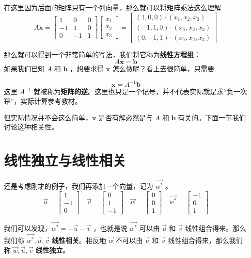 在这里因为后面的矩阵只有一个列向量，那么就可以将矩阵乘法这么理解
$$
A\mathbf x=\begin{bmatrix}1 & 0 & 0\\-1 & 1 & 0\\0 & -1 & 1\end{bmatrix}\begin{bmatrix}x_1\\x_2\\x_3\end{bmatrix}=\begin{bmatrix}(1,0,0)\cdot(x_1,x_2,x_3)\\(-1,1,0)\cdot(x_1,x_2,x_3)\\(0,-1,1)\cdot(x_1,x_2,x_3)\end{bmatrix}
$$

那么就可以得到一个非常简单的写法，我们将它称为\textbf{线性方程组}：
$$
A\mathbf x=\mathbf b
$$
如果我们已知 $A$ 和 $\mathbf b$ ，想要求得 $\mathbf x$  怎么做呢？看上去很简单，只需要

$$
\mathbf x=A^{-1}\mathbf b
$$
这里 $A^{-1}$ 就被称为\textbf{矩阵的逆}。这里也只是一个记号，并不代表实际就是求“负一次幂”，实际计算参考教材。

但实际情况并不会这么简单，$\mathbf x$ 是否有解必然是与 $A$ 和 $\mathbf b$ 有关的。下面一节我们讨论这种相关性。

\section{线性独立与线性相关}

还是考虑刚才的例子，我们再添加一个向量，记为 $\vec{w^*}$ 。
$$
\vec u=\begin{bmatrix}1\\-1\\0\end{bmatrix}\quad
\vec v=\begin{bmatrix}0\\1\\-1\end{bmatrix}\quad
\vec w=\begin{bmatrix}0\\0\\1\end{bmatrix}\quad 
\vec{w^*}=\begin{bmatrix}-1\\0\\1\end{bmatrix}
$$

我们可以发现，$\vec{w^*}=-\vec u-\vec v$ ，也就是说 $\vec{w^*}$ 可以由 $\vec u$ 和 $\vec v$ 线性组合得来。那么我们称 $\vec{w^*},\vec u,\vec v$ \textbf{线性相关}。相反地 $\vec{w}$ 不可以由 $\vec u$ 和 $\vec v$ 线性组合得来，那么我们称 $\vec{w},\vec u,\vec v$ \textbf{线性独立}。

